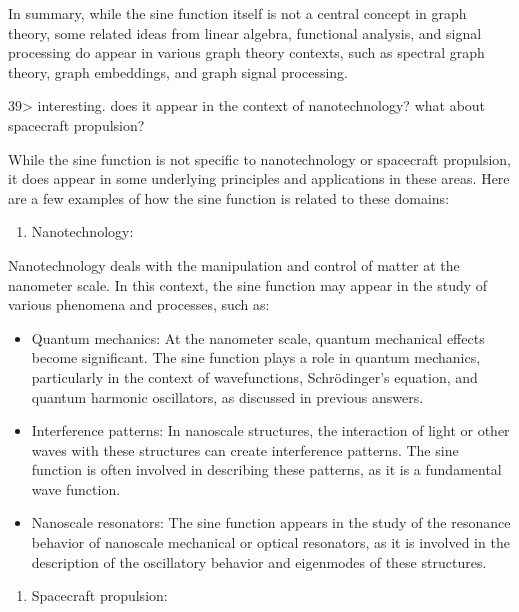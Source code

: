 \documentclass[
]{article}
\providecommand{\tightlist}{%
  \setlength{\itemsep}{0pt}\setlength{\parskip}{0pt}}
\begin{document}
In summary, while the sine function itself is not a central concept in
graph theory, some related ideas from linear algebra, functional
analysis, and signal processing do appear in various graph theory
contexts, such as spectral graph theory, graph embeddings, and graph
signal processing.

39\textgreater{} interesting. does it appear in the context of
nanotechnology? what about spacecraft propulsion?

While the sine function is not specific to nanotechnology or spacecraft
propulsion, it does appear in some underlying principles and
applications in these areas. Here are a few examples of how the sine
function is related to these domains:

\begin{enumerate}
\def\labelenumi{\arabic{enumi}.}
\tightlist
\item
  Nanotechnology:
\end{enumerate}

Nanotechnology deals with the manipulation and control of matter at the
nanometer scale. In this context, the sine function may appear in the
study of various phenomena and processes, such as:

\begin{itemize}
\item
  Quantum mechanics: At the nanometer scale, quantum mechanical effects
  become significant. The sine function plays a role in quantum
  mechanics, particularly in the context of wavefunctions, Schrödinger's
  equation, and quantum harmonic oscillators, as discussed in previous
  answers.
\item
  Interference patterns: In nanoscale structures, the interaction of
  light or other waves with these structures can create interference
  patterns. The sine function is often involved in describing these
  patterns, as it is a fundamental wave function.
\item
  Nanoscale resonators: The sine function appears in the study of the
  resonance behavior of nanoscale mechanical or optical resonators, as
  it is involved in the description of the oscillatory behavior and
  eigenmodes of these structures.
\end{itemize}

\begin{enumerate}
\def\labelenumi{\arabic{enumi}.}
\setcounter{enumi}{1}
\tightlist
\item
  Spacecraft propulsion:
\end{enumerate}
\end{document}
